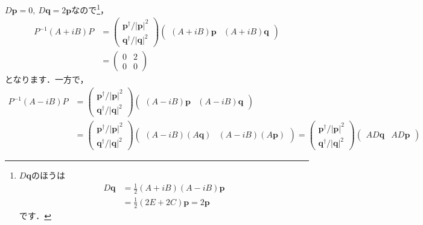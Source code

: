 \documentclass[a4paper,pdflatex,ja=standard]{bxjsarticle}
\begin{document}
\begin{enumerate}
\begin{enumerate}
    $D\bm{p}=0,\ D\bm{q}=2\bm{p}$なので\footnote{
      $D\bm{q}$のほうは
      \begin{align*}
        D\bm{q}
        &=
        \frac{1}{2}(A+iB)(A-iB)\bm{p}
        \nonumber
        \\
        &=
        \frac{1}{2}(2E+2C)\bm{p}
        =
        2\bm{p}
      \end{align*}
      です．
    }，
    \begin{align}
      P^{-1}(A+iB)P
      &=
      \begin{pmatrix}
        \bm{p}^{\dag}/|\bm{p}|^2 \\
        \bm{q}^{\dag}/|\bm{q}|^2 
      \end{pmatrix}
      \begin{pmatrix}
        (A+iB)\bm{p} & (A+iB)\bm{q}
      \end{pmatrix}    
      \nonumber
      \\
      &=
      \begin{pmatrix}
        0 & 2 \\
        0 & 0
      \end{pmatrix}
    \end{align}
    となります．一方で，
    \begin{align}
      P^{-1}(A-iB)P
      &=
      \begin{pmatrix}
        \bm{p}^{\dag}/|\bm{p}|^2 \\
        \bm{q}^{\dag}/|\bm{q}|^2 
      \end{pmatrix}
      \begin{pmatrix}
        (A-iB)\bm{p} & (A-iB)\bm{q}
      \end{pmatrix}    
      \nonumber
      \\
      &=
      \begin{pmatrix}
        \bm{p}^{\dag}/|\bm{p}|^2 \\
        \bm{q}^{\dag}/|\bm{q}|^2 
      \end{pmatrix}
      \begin{pmatrix}
        (A-iB)(A\bm{q}) & (A-iB)(A\bm{p})
      \end{pmatrix}    
      =
      \begin{pmatrix}
        \bm{p}^{\dag}/|\bm{p}|^2 \\
        \bm{q}^{\dag}/|\bm{q}|^2 
      \end{pmatrix}
      \begin{pmatrix}
        AD\bm{q} & AD\bm{p}
      \end{pmatrix}          

\end{align}
\end{enumerate}
\end{enumerate}
\end{document}

